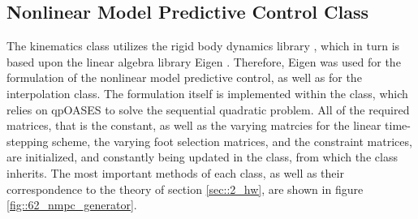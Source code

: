 \subsection{Nonlinear Model Predictive Control Class}
The kinematics class utilizes the rigid body dynamics library \cite{felis2017rbdl}, which in turn is based upon the linear algebra library Eigen \cite{eigenweb}. Therefore, Eigen was used for the formulation of the nonlinear model predictive control, as well as for the interpolation class. The formulation itself is implemented within the  class, which relies on qpOASES \cite{ferreau2014qpoases} to solve the sequential quadratic problem. All of the required matrices, that is the constant, as well as the varying matrcies for the linear time-stepping scheme, the varying foot selection matrices, and the constraint matrices, are initialized, and constantly being updated in the  class, from which the  class inherits. The most important methods of each class, as well as their correspondence to the theory of section \ref{sec::2_hw}, are shown in figure \ref{fig::62_nmpc_generator}.
